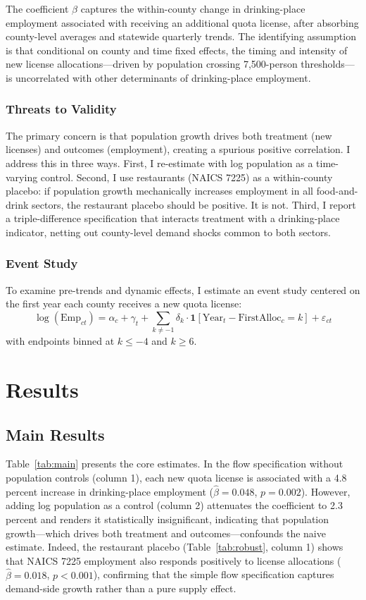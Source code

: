 \documentclass[12pt]{article}
\begin{document}
The coefficient $\beta$ captures the within-county change in drinking-place employment associated with receiving an additional quota license, after absorbing county-level averages and statewide quarterly trends. The identifying assumption is that conditional on county and time fixed effects, the timing and intensity of new license allocations---driven by population crossing 7,500-person thresholds---is uncorrelated with other determinants of drinking-place employment.

\subsubsection*{Threats to Validity} The primary concern is that population growth drives both treatment (new licenses) and outcomes (employment), creating a spurious positive correlation. I address this in three ways. First, I re-estimate with log population as a time-varying control. Second, I use restaurants (NAICS 7225) as a within-county placebo: if population growth mechanically increases employment in all food-and-drink sectors, the restaurant placebo should be positive. It is not. Third, I report a triple-difference specification that interacts treatment with a drinking-place indicator, netting out county-level demand shocks common to both sectors.

\subsubsection*{Event Study} To examine pre-trends and dynamic effects, I estimate an event study centered on the first year each county receives a new quota license:
\begin{equation}
\log(\text{Emp}_{ct}) = \alpha_c + \gamma_t + \sum_{k \neq -1} \delta_k \cdot \mathbf{1}[\text{Year}_t - \text{FirstAlloc}_c = k] + \varepsilon_{ct}
\label{eq:event}
\end{equation}
with endpoints binned at $k \leq -4$ and $k \geq 6$.

\section{Results}

\subsection{Main Results}

Table~\ref{tab:main} presents the core estimates. In the flow specification without population controls (column 1), each new quota license is associated with a 4.8 percent increase in drinking-place employment ($\hat{\beta} = 0.048$, $p = 0.002$). However, adding log population as a control (column 2) attenuates the coefficient to 2.3 percent and renders it statistically insignificant, indicating that population growth---which drives both treatment and outcomes---confounds the naive estimate. Indeed, the restaurant placebo (Table~\ref{tab:robust}, column 1) shows that NAICS 7225 employment also responds positively to license allocations ($\hat{\beta} = 0.018$, $p < 0.001$), confirming that the simple flow specification captures demand-side growth rather than a pure supply effect.
\end{document}
